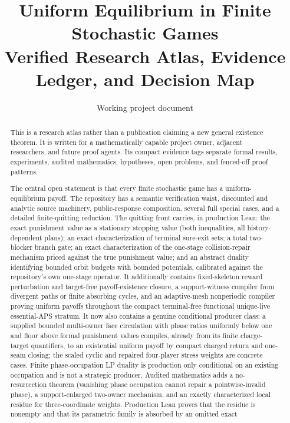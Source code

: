 \documentclass[11pt]{article}
\title{Uniform Equilibrium in Finite Stochastic Games\\
\large Verified Research Atlas, Evidence Ledger, and Decision Map}
\author{Working project document}
\date{}
\begin{document}
\maketitle

\begin{abstract}
This is a research atlas rather than a publication claiming a new general
existence theorem.  It is written for a mathematically capable project owner,
adjacent researchers, and future proof agents.  Its compact evidence tags
separate formal results, experiments, audited mathematics, hypotheses, open
problems, and fenced-off proof patterns.

The central open statement is that every finite stochastic game has a
uniform-equilibrium payoff.  The repository has a semantic verification waist,
discounted and analytic source machinery, public-response composition,
several full special cases, and a detailed finite-quitting reduction.  The
quitting front carries, in production Lean: the
exact punishment value as a stationary stopping value (both inequalities, all
history-dependent plans); an exact characterization of terminal sure-exit
sets; a total two-blocker branch gate; an exact characterization of the
one-stage collision-repair mechanism priced against the true punishment
value; and an abstract duality identifying bounded orbit budgets with bounded
potentials, calibrated against the repository's own one-stage operator.  It
additionally contains fixed-skeleton reward perturbation and
target-free payoff-existence closure, a support-witness compiler from
divergent paths or finite absorbing cycles, and an adaptive-mesh nonperiodic
compiler proving uniform payoffs throughout the compact terminal-free
functional unique-live essential-APS stratum.  It now also contains a genuine
conditional producer class: a supplied bounded multi-owner face circulation
with phase ratios uniformly below one and floor above formal punishment values
compiles, already from its finite charge-target quantifiers, to an existential
uniform payoff by compact charged return and one-seam closing;
the scaled cyclic and repaired four-player stress weights are concrete cases.
Finite phase-occupation LP duality is production only conditional on an
existing occupation and is not a strategic producer.
Audited mathematics adds a no-resurrection theorem (vanishing phase
occupation cannot repair a pointwise-invalid phase), a support-enlarged
two-owner mechanism, and an exactly characterized local residue for
three-coordinate weights.  Production Lean proves that the residue is nonempty
and that its parametric family is absorbed by an omitted exact

\end{abstract}
\end{document}
